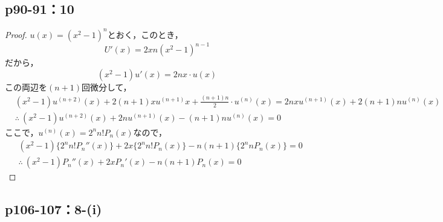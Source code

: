 \documentclass[uplatex,dvipdfmx,a4paper,10pt,fleqn]{jsarticle}
\begin{document}
\subsection*{p90-91：10}

\begin{tleftbar}
    \begin{proof}
    $u(x)= (x^2-1)^n$とおく，このとき，
    \[
     U'(x)= 2x n(x^2-1)^{n-1}
    \]
    だから，
    \[
        (x^2-1) u'(x)=2nx \cdot u(x)
    \]
    この両辺を$(n+1)$回微分して，
    \begin{align*}
       & (x^2-1)u^{(n+2)}(x)+2(n+1)x u^{(n+1)} x + \frac{(n+1)n}{2} \cdot u^{(n)} (x) = 2nx u^{(n+1)}(x) + 2(n+1) n u^{(n)}(x) \\
       & \therefore ~(x^2-1)u^{(n+2)}(x) + 2n u^{(n+1)}(x)-(n+1)n u^{(n)}(x)=0
    \end{align*}
    ここで，$ u^{(n)} (x)= 2^n n! P_n (x)$なので，
    \begin{align*} 
        & (x^2 -1) \{ 2^n n! P_n ''(x) \} +2x \{ 2^n n! P_n (x) \} -n(n+1) \{ 2^n n P_n(x) \} =0 \\
      &   \therefore ~ (x^2-1) P_n ''(x)+2x P_n '(x) -n(n+1) P_n (x)=0
    \end{align*}
\end{proof}
\end{tleftbar}


\subsection*{p106-107：8-(i)}
\end{document}
